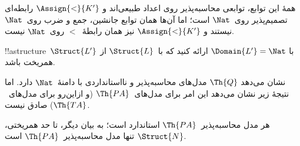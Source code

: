 \documentclass[../../../include/open-logic-section]{subfiles}
\begin{document}
\begin{ex}
همهٔ این توابع، توابعی محاسبه‌پذیر روی اعداد طبیعی‌اند و
$\Assign{<}{K'}$ رابطه‌ای تصمیم‌پذیر روی~$\Nat$ است؛ اما آن‌ها همان
توابع جانشین، جمع و ضرب روی~$\Nat$ نیستند و $\Assign{<}{K'}$ نیز همان
رابطهٔ~$<$ روی~$\Nat$ نیست.
\end{ex}

\begin{prob}
!!a{structure}~$\Struct{L'}$ با $\Domain{L'} = \Nat$ ارائه کنید که
با~$\Struct{L}$ از
 همریخت باشد.
\end{prob}

\begin{explain}
 نشان می‌دهد $\Th{Q}$ مدل‌های محاسبه‌پذیر و
نااستانداردی با دامنهٔ~$\Nat$ دارد. اما نتیجهٔ زیر نشان می‌دهد این امر
برای مدل‌های~$\Th{PA}$ (و ازاین‌رو برای مدل‌های~$\Th{TA}$) صادق نیست.
\end{explain}

\begin{thm}
هر مدل محاسبه‌پذیر~$\Th{PA}$ استاندارد است؛ به بیان دیگر، تا حد
همریختی، $\Struct{N}$ تنها مدل محاسبه‌پذیر~$\Th{PA}$ است.
\end{thm}
\end{document}

